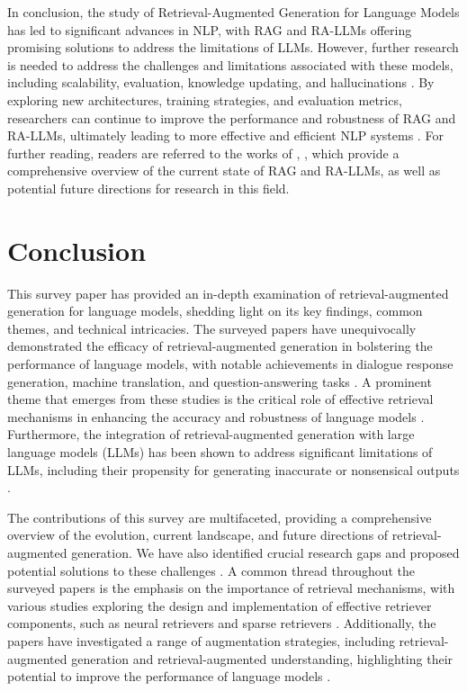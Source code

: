 \documentclass[conference]{IEEEtran}
\begin{document}
In conclusion, the study of Retrieval-Augmented Generation for Language Models has led to significant advances in NLP, with RAG and RA-LLMs offering promising solutions to address the limitations of LLMs. However, further research is needed to address the challenges and limitations associated with these models, including scalability, evaluation, knowledge updating, and hallucinations \cite{b30}. By exploring new architectures, training strategies, and evaluation metrics, researchers can continue to improve the performance and robustness of RAG and RA-LLMs, ultimately leading to more effective and efficient NLP systems \cite{b31}. For further reading, readers are referred to the works of \cite{b32}, \cite{b33}, which provide a comprehensive overview of the current state of RAG and RA-LLMs, as well as potential future directions for research in this field.

\section{Conclusion}
This survey paper has provided an in-depth examination of retrieval-augmented generation for language models, shedding light on its key findings, common themes, and technical intricacies. The surveyed papers have unequivocally demonstrated the efficacy of retrieval-augmented generation in bolstering the performance of language models, with notable achievements in dialogue response generation, machine translation, and question-answering tasks \cite{b1}. A prominent theme that emerges from these studies is the critical role of effective retrieval mechanisms in enhancing the accuracy and robustness of language models \cite{b2}. Furthermore, the integration of retrieval-augmented generation with large language models (LLMs) has been shown to address significant limitations of LLMs, including their propensity for generating inaccurate or nonsensical outputs \cite{b3}.

The contributions of this survey are multifaceted, providing a comprehensive overview of the evolution, current landscape, and future directions of retrieval-augmented generation. We have also identified crucial research gaps and proposed potential solutions to these challenges \cite{b4}. A common thread throughout the surveyed papers is the emphasis on the importance of retrieval mechanisms, with various studies exploring the design and implementation of effective retriever components, such as neural retrievers and sparse retrievers \cite{b5}. Additionally, the papers have investigated a range of augmentation strategies, including retrieval-augmented generation and retrieval-augmented understanding, highlighting their potential to improve the performance of language models \cite{b6}.
\end{document}
